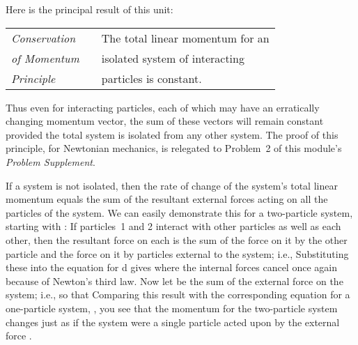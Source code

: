 {
Here is the principal result of this unit:
\begin{center}\begin{tabular}{l p{0.3in} |l|} \cline{3-3}
\textit{Conservation} & & The total linear momentum for an \\
\textit{of Momentum}  & & isolated system of interacting \\
\textit{Principle}    & & particles is constant. \\ \cline{3-3}
\end{tabular}\end{center}
Thus even for  interacting particles, each of which may have an
erratically changing momentum vector, the sum of these  vectors will
remain constant provided the total system is isolated from any other system.
The proof of this principle, for Newtonian mechanics, is relegated to Problem~2 of this module's \textit{Problem Supplement}.

If a system is not isolated, then the rate of change of the system's total
linear momentum equals the sum of the resultant external forces acting on all
the particles of the system.
We can easily demonstrate this for a two-particle system, starting with
:
%
%
If particles~1 and 2 interact with other particles as well as each other,
then the resultant force on each is the sum of the force on it by the other
particle and the force on it by particles external to the system; i.e.,
%
%
%
Substituting these into the equation for d gives
%
%
where the internal forces cancel once again because of Newton's third law.
Now let  be the sum of the external force on the system;
i.e.,
%
%
so that
%
%
Comparing this result with the corresponding equation for a one-particle
system, , you see that the momentum for the
two-particle system changes just as if the system were a single particle acted
upon by the external force .
} %
